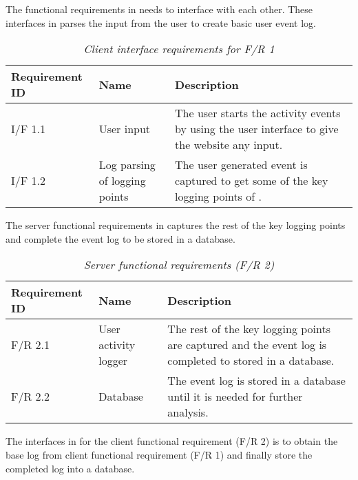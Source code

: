 The functional requirements in  needs to interface with each other. These interfaces in  parses the input from the user to create basic user event log.

\begin{table}[!htb]
	\centering
	\small
	\caption[Client interface requirements]
	{\textit{Client interface requirements for F/R 1}}
	\label{tbl:Ch2_Client_Interface_Requirements}
	\begin{tabularx}{\textwidth}{|l|l|X|}
		\hline \textbf{Requirement ID} & \textbf{Name} & \textbf{Description} \\
		\hline I/F 1.1 & User input & The user starts the activity events by using the user interface to give the website any input.\\
		\hline I/F 1.2 & Log parsing of logging points & The user generated event is captured to get some of the key logging points of \Cref{tbl:CH1_Log_Basic_Attributes}.\\
		\hline
	\end{tabularx}
\end{table}

The server functional requirements in  captures the rest of the key logging points and complete the event log to be stored in a database. 

\begin{table}[!htb]
	\centering
	\small
	\caption[Server functional requirements]
	{\textit{Server functional requirements (F/R 2)}}
	\label{tbl:Ch2_Server_Functional_Requirements}
	\begin{tabularx}{\textwidth}{|l|l|X|}
		\hline \textbf{Requirement ID} & \textbf{Name} & \textbf{Description} \\
		\hline F/R 2.1 & User activity logger & The rest of the key logging points are captured and the event log is completed to stored in a database.\\
		\hline F/R 2.2 & Database & The event log is stored in a database until it is needed for further analysis.\\
		\hline
	\end{tabularx}
\end{table}

The interfaces in  for the client functional requirement (F/R 2) is to obtain the base log from client functional requirement (F/R 1) and finally store the completed log into a database.

